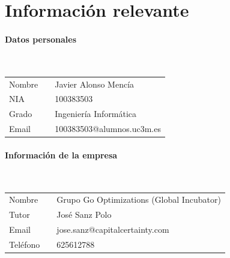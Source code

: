 \documentclass[a4paper,12pt]{article}
\begin{document}
\pagestyle{fancy}
\fancyhead{} %
\setlength\headheight{21.2pt}

\renewcommand{\tablename}{\textbf{Tabla}} %
\renewcommand{\figurename}{\textbf{Figure}} %
\renewcommand{\listtablename}{Índice de tablas}

\newpage

\tableofcontents

\newpage



\newpage



\section{Información relevante}

\paragraph{Datos personales}\mbox{}\\
\begin{table}[H]
\begin{tabular}{@{}lll@{}}
Nombre   & \mbox{} & Javier Alonso Mencía      \\
NIA    & \mbox{} & 100383503                 \\
Grado & \mbox{\phantom{adrfgsegkrdthrs}} & Ingeniería Informática     \\
Email  & \mbox{} & 100383503@alumnos.uc3m.es
\end{tabular}
\end{table}

\paragraph{Información de la empresa}\mbox{}\\
\begin{table}[H]
\begin{tabular}{@{}lll@{}}
Nombre  &                                       & Grupo Go Optimizations (Global Incubator) \\
Tutor &                                    & José Sanz Polo                                   \\
Email & \mbox{\phantom{adrfgsewefaefrtz}} &  jose.sanz@capitalcertainty.com                      \\
Teléfono & \mbox{\phantom{adrfgsewefaefrtz}} &  
625612788
\end{tabular}
\end{table}
\end{document}
